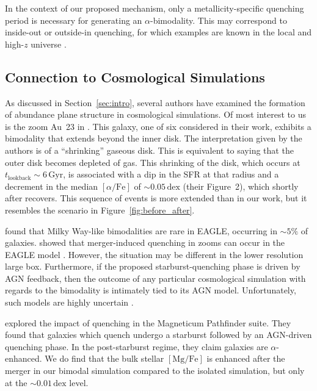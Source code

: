 \documentclass[twocolumn,linenumbers,trackchanges]{aastex631}
\newcommand{\Gyr}{\ensuremath{\textrm{Gyr}}}
\newcommand{\MgFe}{\ensuremath{[\textrm{Mg}/\textrm{Fe}]}}
\newcommand{\alphaFe}{\ensuremath{[\alpha/\textrm{Fe}]}}
\newcommand{\dex}{\ensuremath{\textrm{dex}}}
\begin{document}
In the context of our proposed mechanism, only a metallicity-specific quenching period is necessary for generating an $\alpha$-bimodality. This may correspond to inside-out or outside-in quenching, for which examples are known in the local and high-$z$ universe \citep[e.g.,][]{2015Sci...348..314T,2019ApJ...872...50L}.

\subsection{Connection to Cosmological Simulations}\label{ssec:cosmo}
As discussed in Section~\ref{sec:intro}, several authors have examined the formation of abundance plane structure in cosmological simulations. Of most interest to us is the zoom Au~23 in \citet{2018MNRAS.474.3629G}. This galaxy, one of six considered in their work, exhibits a bimodality that extends beyond the inner disk. The interpretation given by the authors is of a ``shrinking'' gaseous disk. This is equivalent to saying that the outer disk becomes depleted of gas. This shrinking of the disk, which occurs at $t_{\textrm{lookback}}\sim6\,\Gyr$, is associated with a dip in the SFR at that radius and a decrement in the median \alphaFe{} of $\sim0.05\,\dex$ (their Figure~2), which shortly after recovers. This sequence of events is more extended than in our work, but it resembles the scenario in Figure~\ref{fig:before_after}.

\citet{2018MNRAS.477.5072M} found that Milky Way-like bimodalities are rare in EAGLE, occurring in $\sim5\%$ of galaxies. \citet{2021MNRAS.501..236D,2022MNRAS.515.1430D} showed that merger-induced quenching in zooms can occur in the EAGLE model \citep[see also][]{2017MNRAS.465..547P}. However, the situation may be different in the lower resolution large box. Furthermore, if the proposed starburst-quenching phase is driven by AGN feedback, then the outcome of any particular cosmological simulation with regards to the bimodality is intimately tied to its AGN model. Unfortunately, such models are highly uncertain \citep[e.g.][]{2022MNRAS.511.3751H}.

\citet{2023arXiv231016085K} explored the impact of quenching in the Magneticum Pathfinder suite. They found that galaxies which quench undergo a starburst followed by an AGN-driven quenching phase. In the post-starburst regime, they claim galaxies are $\alpha$-enhanced. We do find that the bulk stellar \MgFe{} is enhanced after the merger in our bimodal simulation compared to the isolated simulation, but only at the $\sim0.01\,\dex$ level.
\end{document}
